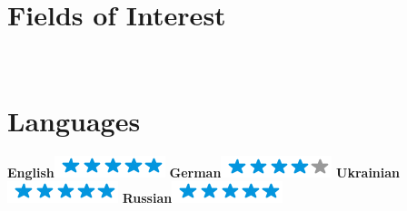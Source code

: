 \documentclass[]{friggeri-cv}
\begin{document}
\begin{aside}
  \section{Fields of Interest}
    ~
  \section{Languages}
    \textbf{English}\includegraphics[scale=0.40]{img/5stars.png}
    \textbf{German}\includegraphics[scale=0.40]{img/4stars.png}
    \textbf{Ukrainian}\includegraphics[scale=0.40]{img/5stars.png}
    \textbf{Russian}\includegraphics[scale=0.40]{img/5stars.png}
    ~
\end{aside}
~
\end{document}
